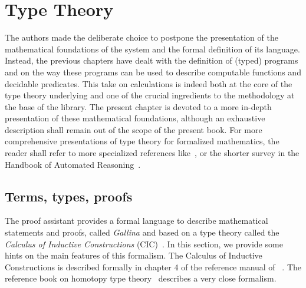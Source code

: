 \chapter{Type Theory}{}
\label{ch:ttch}

The authors made the deliberate choice to postpone the presentation of
the mathematical foundations of the \Coq{} system and the formal
definition of its language. Instead, the previous chapters have
dealt with the definition of (typed) programs and on the way these
programs can be used to describe computable functions and decidable
predicates. This take on calculations is indeed both at the core of
the type theory underlying \Coq{} and one of the crucial ingredients
to the methodology at the base of the \mcbMC{} library. The present chapter is
devoted to a more in-depth presentation of these mathematical
foundations, although an exhaustive description shall remain out of
the scope of the present book. For more comprehensive presentations of
type theory for formalized mathematics, the reader shall refer to more
specialized references like~\cite{ttfp}, or the
shorter survey in the Handbook of Automated
Reasoning~\cite[Volume 2, chapter 18]{handbook-ar}.

\section{Terms, types, proofs}\label{sec:chi}

The \Coq{} proof assistant provides a formal language to describe
mathematical statements and proofs, called
\emph{Gallina} and based on a type theory called the
\emph{Calculus of Inductive
  Constructions} (CIC)~\cite{coquand:huet:88,CoPa89}. In this section, we
provide some hints on the main features of this formalism. The
Calculus of Inductive Constructions is described formally in chapter 4
of the reference manual of \Coq{}~\cite{Coq:manual}. The reference book on
homotopy type theory~\cite{hottbook} describes a very close formalism.



